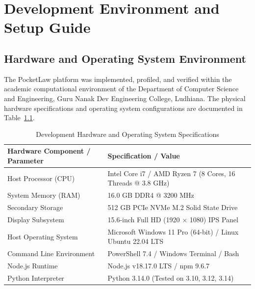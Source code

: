 
\appendix

\chapter{Development Environment and Setup Guide}
\label{app:development_environment}

\section{Hardware and Operating System Environment}
The PocketLaw platform was implemented, profiled, and verified within the academic computational environment of the Department of Computer Science and Engineering, Guru Nanak Dev Engineering College, Ludhiana. The physical hardware specifications and operating system configurations are documented in Table~\ref{tab:hardware_environment}.

\begin{table}[H]
\caption{Development Hardware and Operating System Specifications}
\label{tab:hardware_environment}
\centering
\small
\begin{tabularx}{\textwidth}{p{4.5cm}X}
\toprule
\textbf{Hardware Component / Parameter} & \textbf{Specification / Value} \\
\midrule
Host Processor (CPU) & Intel Core i7 / AMD Ryzen 7 (8 Cores, 16 Threads @ 3.8 GHz) \\
System Memory (RAM) & 16.0 GB DDR4 @ 3200 MHz \\
Secondary Storage & 512 GB PCIe NVMe M.2 Solid State Drive \\
Display Subsystem & 15.6-inch Full HD (1920 $\times$ 1080) IPS Panel \\
Host Operating System & Microsoft Windows 11 Pro (64-bit) / Linux Ubuntu 22.04 LTS \\
Command Line Environment & PowerShell 7.4 / Windows Terminal / Bash \\
Node.js Runtime & Node.js v18.17.0 LTS / npm 9.6.7 \\
Python Interpreter & Python 3.14.0 (Tested on 3.10, 3.12, 3.14) \\
\bottomrule
\end{tabularx}
\end{table}

